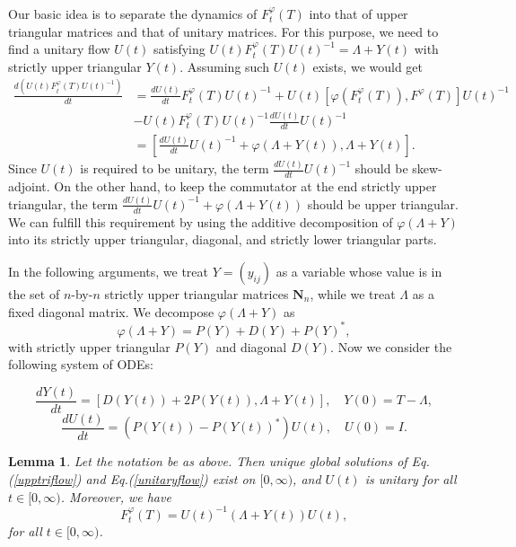 \documentclass[12pt]{article}
\newtheorem{lemma}[theorem]{Lemma}
\theoremstyle{definition}
\numberwithin{equation}{section}
\begin{document}
Our basic idea is to separate the dynamics of $F^\varphi_t(T)$ into that of 
upper triangular matrices and that of unitary matrices.  
For this purpose, we need to find a unitary flow $U(t)$ satisfying $U(t)F^\varphi_t(T)U(t)^{-1}=\Lambda+Y(t)$ 
with strictly upper triangular $Y(t)$. 
Assuming such $U(t)$ exists, we would get 
\begin{align*}
	\frac{d (U(t)F^\varphi_t(T)U(t)^{-1})}{dt} &=\frac{dU(t)}{dt}F^\varphi_t(T)U(t)^{-1}
	+U(t)[\varphi(F^\varphi_t(T)),F^\varphi(T)]U(t)^{-1}\\
	&-U(t)F^\varphi_t(T)U(t)^{-1}\frac{dU(t)}{dt}U(t)^{-1}\\
	&=[\frac{dU(t)}{dt}U(t)^{-1}+\varphi(\Lambda+Y(t)),\Lambda+Y(t)].
\end{align*}
Since $U(t)$ is required to be unitary, the term $\frac{dU(t)}{dt}U(t)^{-1}$ should be skew-adjoint. 
On the other hand, to keep the commutator at the end strictly upper triangular, the term 
$\frac{dU(t)}{dt}U(t)^{-1}+\varphi(\Lambda+Y(t))$ should be upper triangular. 
We can fulfill this requirement by using the additive decomposition of $\varphi(\Lambda+Y)$ into 
its strictly upper triangular, diagonal, and strictly lower triangular parts. 

In the following arguments, we treat $Y=(y_{ij})$ as a variable whose value is in the set of $n$-by-$n$ 
strictly upper triangular matrices $\mathbf{N}_n$, while we treat $\Lambda$ as a fixed diagonal matrix. 
We decompose $\varphi(\Lambda +Y)$ as 
\[\varphi(\Lambda +Y)=P(Y)+D(Y)+P(Y)^*,\] 
with strictly upper triangular $P(Y)$ and diagonal $D(Y)$.  
Now we consider the following system of ODEs: 

\begin{equation}\label{upptriflow}
\frac{dY(t)}{dt}=[D(Y(t))+2P(Y(t)),\Lambda+Y(t)],\quad Y(0)=T-\Lambda,
\end{equation}
\begin{equation}\label{unitaryflow}
\frac{dU(t)}{dt}=(P(Y(t))-P(Y(t))^*)U(t),\quad U(0)=I.
\end{equation}

\begin{lemma}
Let the notation be as above. 
Then unique global solutions of Eq.(\ref{upptriflow}) and Eq.(\ref{unitaryflow}) exist on $[0,\infty)$, 
and $U(t)$ is unitary for all $t\in [0,\infty)$. 
Moreover, we have 
\[F^\varphi_t(T)=U(t)^{-1}(\Lambda+Y(t))U(t),\]
for all $t\in [0,\infty)$. 
\end{lemma}
\end{document}
